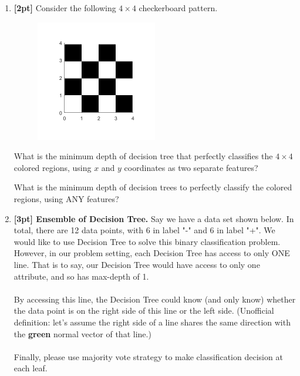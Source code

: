 \documentclass[12pt]{article}
\renewcommand{\circle}{\tikz\draw[black] (0,0) circle (1ex);}
\begin{document}
\begin{enumerate}
    \item \textbf{[2pt]} Consider the following $4\times 4$ checkerboard pattern. 
    \begin{figure}[H]
        \centering
        \includegraphics[width = 0.5\textwidth]{checkerboard.png}
        \label{Q_2dt}
    \end{figure}
    What is the minimum depth of decision tree that perfectly classifies the $4\times 4$ colored regions, using $x$ and $y$ coordinates as two separate features? 
    What is the minimum depth of decision trees to perfectly classify the colored regions, using ANY features?
    
    \clearpage
    
    \item \textbf{[3pt] Ensemble of Decision Tree.} Say we have a data set shown below. In total, there are 12 data points, with 6 in label "-" and 6 in label "+". We would like to use Decision Tree to solve this binary classification problem. However, in our problem setting, each Decision Tree has access to only ONE line. That is to say, our Decision Tree would have access to only one attribute, and so has max-depth of 1. \\ \\
    By accessing this line, the Decision Tree could know (and only know) whether the data point is on the right side of this line or the left side. (Unofficial definition: let's assume the right side of a line shares the same direction with the \textcolor{OliveGreen}{\textbf{green}} normal vector of that line.) \\ \\
    Finally, please use majority vote strategy to make classification decision at each leaf.\\
    

\end{enumerate}
\end{document}
